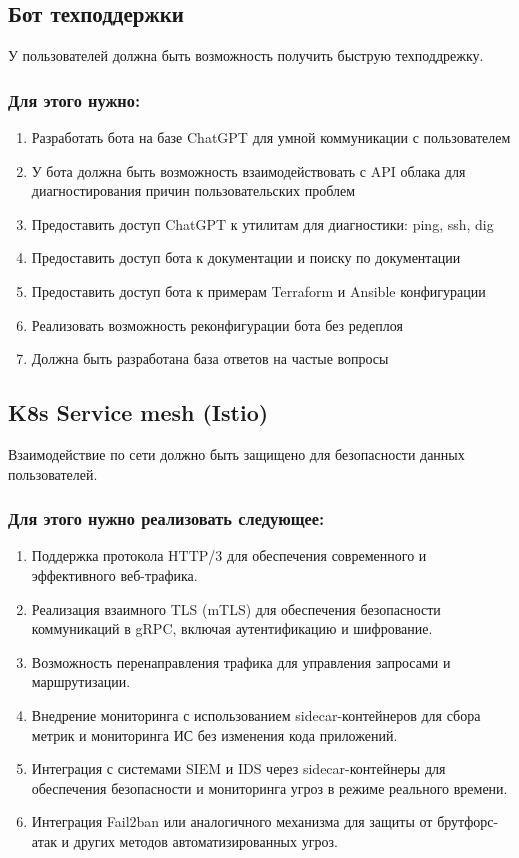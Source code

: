 \documentclass[14pt, a4paper]{extarticle}
\begin{document}
\subsection{Бот техподдержки}

У пользователей должна быть возможность получить быструю техподдрежку.

\subsubsection*{Для этого нужно:}

\begin{enumerate}
\item Разработать бота на базе ChatGPT для умной коммуникации с пользователем
\item У бота должна быть возможность взаимодействовать с API облака для диагностирования причин пользовательских проблем
\item Предоставить доступ ChatGPT к утилитам для диагностики: ping, ssh, dig
\item Предоставить доступ бота к документации и поиску по документации
\item Предоставить доступ бота к примерам Terraform и Ansible конфигурации
\item Реализовать возможность реконфигурации бота без редеплоя
\item Должна быть разработана база ответов на частые вопросы
\end{enumerate}

\subsection{K8s Service mesh (Istio)}

Взаимодействие по сети должно быть защищено для безопасности данных пользователей.

\subsubsection*{Для этого нужно реализовать следующее:}

\begin{enumerate}
\item Поддержка протокола HTTP/3 для обеспечения современного и эффективного веб-трафика.
\item Реализация взаимного TLS (mTLS) для обеспечения безопасности коммуникаций в gRPC, включая аутентификацию и шифрование.
\item Возможность перенаправления трафика для управления запросами и маршрутизации.
\item Внедрение мониторинга с использованием sidecar-контейнеров для сбора метрик и мониторинга ИС без изменения кода приложений.
\item Интеграция с системами SIEM и IDS через sidecar-контейнеры для обеспечения безопасности и мониторинга угроз в режиме реального времени.
\item Интеграция Fail2ban или аналогичного механизма для защиты от брутфорс-атак и других методов автоматизированных угроз.
\end{enumerate}
\end{document}
